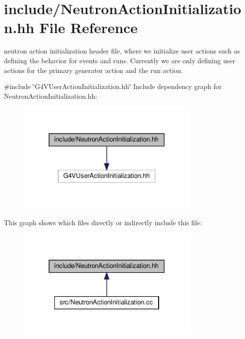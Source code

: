 \hypertarget{NeutronActionInitialization_8hh}{}\section{include/\+Neutron\+Action\+Initialization.hh File Reference}
\label{NeutronActionInitialization_8hh}


neutron action initialization header file, where we initialize user actions such as defining the behavior for events and runs. Currently we are only defining user actions for the primary generator action and the run action.  


{\ttfamily \#include \char`\"{}G4\+V\+User\+Action\+Initialization.\+hh\char`\"{}}\newline
Include dependency graph for Neutron\+Action\+Initialization.\+hh\+:
\nopagebreak
\begin{figure}[H]
\begin{center}
\leavevmode
\includegraphics[width=258pt]{NeutronActionInitialization_8hh__incl}
\end{center}
\end{figure}
This graph shows which files directly or indirectly include this file\+:
\nopagebreak
\begin{figure}[H]
\begin{center}
\leavevmode
\includegraphics[width=258pt]{NeutronActionInitialization_8hh__dep__incl}
\end{center}
\end{figure}
